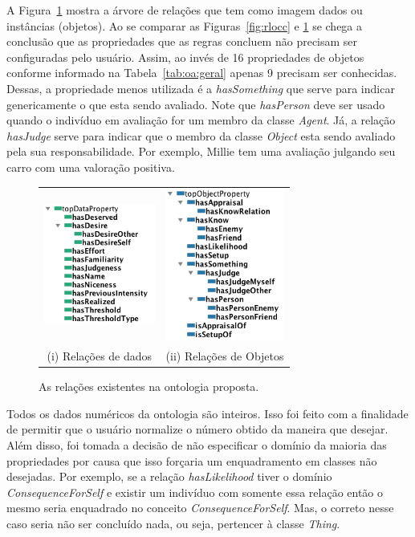 A Figura~\ref{fig:kplocc} mostra a árvore de relações que tem como imagem
dados ou instâncias (objetos). Ao se comparar as Figuras~\ref{fig:rlocc}
e \ref{fig:kplocc} se chega a conclusão que as propriedades que as
regras concluem não precisam ser configuradas pelo usuário. Assim, ao invés de
16 propriedades de objetos conforme informado na Tabela~\ref{tab:oa:geral}
apenas 9 precisam ser conhecidas. Dessas, a propriedade menos utilizada é a
\emph{hasSomething} que serve para indicar genericamente o que esta sendo avaliado. Note que
\emph{hasPerson} deve ser usado quando o indivíduo em avaliação for um membro
da classe \emph{Agent}. Já, a relação \emph{hasJudge} serve para indicar que o
membro da classe \emph{Object} esta sendo avaliado pela sua responsabilidade.
Por exemplo, Millie tem uma avaliação julgando seu carro com uma valoração
positiva.

\begin{figure}[b]
  \centering
  \begin{tabular}{cc}
  \includegraphics[height=4cm]{figuras/dataProperty-LOCC.png} & \includegraphics[height=5cm]{figuras/objectProperty-LOCC.png} \\
  (i) Relações de dados & (ii) Relações de Objetos
  \end{tabular}
  \caption{As relações existentes na ontologia proposta.}
  \label{fig:kplocc}
\end{figure}

Todos os dados numéricos da ontologia são inteiros. Isso foi feito com a
finalidade de permitir que o usuário normalize\dev{} o número obtido da
maneira que desejar. Além disso, foi tomada a decisão de não especificar o
domínio da maioria das propriedades por causa que isso forçaria um
enquadramento em classes não desejadas. Por exemplo, se a relação
\emph{hasLikelihood} tiver o domínio \emph{ConsequenceForSelf} e existir um
indivíduo com somente essa relação então o mesmo seria enquadrado no conceito
\emph{ConsequenceForSelf}. Mas, o correto nesse caso seria não ser concluído nada,
ou seja, pertencer à classe \emph{Thing}.

